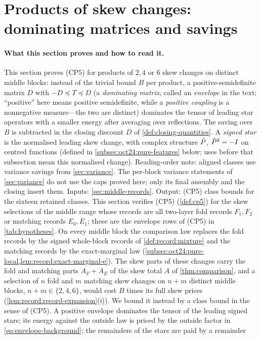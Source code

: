 \section{Products of skew changes: dominating matrices and savings}\label{sec:envelopes}

\paragraph{What this section proves and how to read it.}
This section proves (CP5) for products of $2,4$ or $6$ skew changes
on distinct middle blocks: instead of the trivial bound $B$ per
product, a positive-semidefinite matrix $D$ with
$-D\preceq T\preceq D$ (a \emph{dominating matrix}, called an
\emph{envelope} in the text; ``positive'' here means positive
semidefinite, while a \emph{positive coupling} is a nonnegative
measure---the two are distinct) dominates the tensor of leading
star operators with a smaller energy after averaging over
reflections. The saving over $B$ is subtracted in the closing discount $D$ of \cref{def:closing-quantities}. A
\emph{signed star} is the normalised leading skew change, with
complex structure $\hat P$, $\hat P^2=-I$ on centred functions
(defined in \cref{subsec:oct24:pure-features} below; uses before
that subsection mean this normalised change). Reading-order note:
aligned classes use variance savings from \cref{sec:variance}. The per-block variance statements of \cref{sec:variance} do not use the caps proved here; only its final assembly and the closing insert them. Inputs:
\cref{sec:middle-records}. Output: (CP5) class bounds for the
sixteen retained classes.
This section verifies (CP5) (\cref{def:cp5}) for the skew selections of the
middle range whose records are all two-layer fold records $F_1,F_2$ or matching
records $E_0,E_1$; these are the envelope rows of (CP5) in \cref{tab:hypotheses}.
On every middle block the comparison law replaces the fold records by the signed
whole-block records of \cref{def:record:mixture} and the matching records by the
exact-marginal law (\cref{subsec:oct24:pure-local,lem:record:exact-marginal-e}).
The skew parts of these changes carry the fold and matching parts $A_F+A_E$ of the skew total $A$ of
\cref{thm:comparison}, and a selection of $n$ fold and $m$ matching skew changes
on $n+m$ distinct middle blocks, $n+m\in\{2,4,6\}$, would cost $B$ times its full
skew prices (\cref{lem:record:record-expansion}(i)). We bound it instead by a
class bound in the sense of (CP5). A positive envelope dominates the tensor of the
leading signed stars; its energy against the outside law is priced by the outside factor in \eqref{eq:envelope-background}; the remainders of the stars are paid by a remainder

